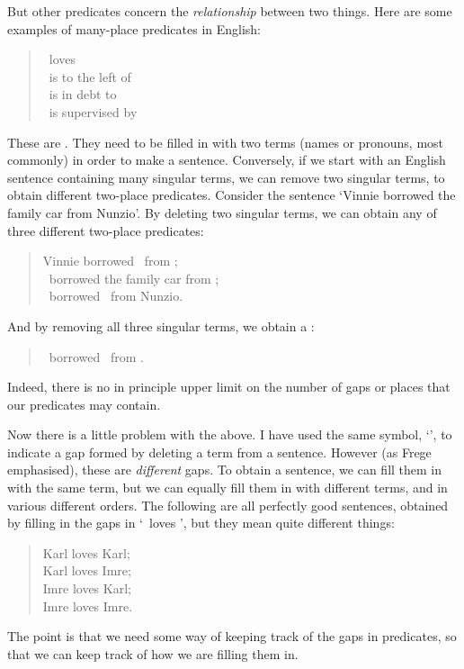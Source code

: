 But other predicates concern the \emph{relationship} between two things. Here are some examples of many-place predicates in English:
	\begin{quote}
		\blank\ loves \blank\\
		\blank\ is to the left of \blank\\
		\blank\ is in debt to \blank\\
		\blank\ is supervised by \blank
	\end{quote}
These are . They need to be filled in with two terms (names or pronouns, most commonly) in order to make a sentence. Conversely, if we start with an English sentence containing many singular terms, we can remove two singular terms, to obtain different two-place predicates. Consider the sentence `Vinnie borrowed the family car from Nunzio'. By deleting two singular terms, we can obtain any of three different two-place predicates:
	\begin{quote}
		Vinnie borrowed \blank\ from \blank;\\
		\blank\ borrowed the family car from \blank;\\
		\blank\ borrowed \blank\ from Nunzio.
	\end{quote}
And by removing all three singular terms, we  obtain a :
	\begin{quote}
		\blank\ borrowed \blank\ from \blank.
	\end{quote}
Indeed, there is no in principle upper limit on the number of gaps or places that our predicates may contain.

Now there is a little problem with the above. I have used the same symbol, `\blank', to indicate a gap formed by deleting a term from a sentence. However (as Frege emphasised), these are \emph{different} gaps. To obtain a sentence, we can fill them in with the same term, but we can equally fill them in with different terms, and in various different orders. The following are all perfectly good sentences, obtained by filling in the gaps in `\blank\ loves \blank', but they mean quite different things:
	\begin{quote}
		Karl loves Karl;\\
		Karl loves Imre;\\
		Imre loves Karl;\\
		Imre loves Imre.
	\end{quote}
The point is that we need some way of keeping track of the gaps in predicates, so that we can keep track of how we are filling them in. 

